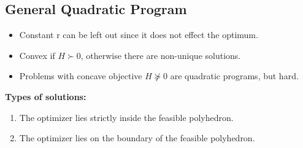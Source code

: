 \documentclass[8pt,a4paper]{scrartcl}
\begin{document}
\begin{multicols*}{3}
\subsection{General Quadratic Program}


\begin{itemize}
\ncompaq
\item Constant r can be left out since it does not effect the optimum.
\item Convex if $H\succ 0$, otherwise there are non-unique solutions.
\item Problems with concave objective $H\not\succeq 0$ are quadratic programs, but hard.
\end{itemize}

\textbf{Types of solutions:}

\begin{enumerate}
\ncompaq
\item The optimizer lies strictly inside the feasible polyhedron.
\item The optimizer lies on the boundary of the feasible polyhedron.
\end{enumerate}


\end{multicols*}
\end{document}
